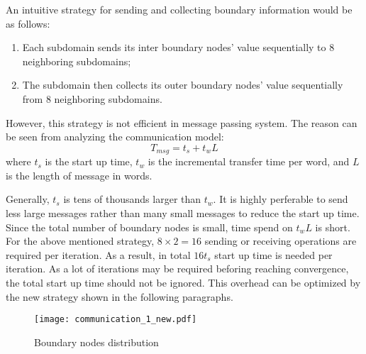 \documentclass{sig-alternate}
\begin{document}
	An intuitive strategy for sending and collecting boundary information would be as follows:

	\begin{enumerate}[1.]
	  \item Each subdomain sends its inter boundary nodes' value sequentially to 8 neighboring subdomains;
	  \item The subdomain then collects its outer boundary nodes' value sequentially from 8 neighboring subdomains.
	\end{enumerate}	

 	However, this strategy is not efficient in message passing system. The reason can be seen from analyzing the
	communication model:
	\begin{equation}
		T_{msg} = t_s + t_wL\label{eq_msg}
	\end{equation}
	where $t_s$ is the start up time, $t_w$ is the incremental transfer time per word, and $L$ is the length of message in words.
	
	Generally, $t_s$ is tens of thousands larger than $t_w$. It is highly perferable to send less 
	large messages rather than many small messages to reduce the start up time. Since the total number of boundary nodes is small, 
	time spend on $t_wL$ is short. For the above mentioned strategy, $8\times 2 = 
	16$ sending or receiving operations are required per iteration. As a result, in total $16t_s$ start up time is
	needed per iteration. As a lot of iterations may be required beforing reaching convergence, the total 
	start up time should not be ignored. This overhead can be optimized by the new strategy shown in the following paragraphs.
\begin{comment}
	In each iteration, only $2$ transferring operations are needed for communication. The new strategy minimizes start up time and 
	greatly decreases the simulation time. However, there is some difficulty to implement above strategy. This is not only because
	the grid connection is irregular, but also because the existance of overlapping. Overlapping makes things even more complicated, 
	as the number of neighboring subdomains are increased from $4$ to $8$, with different overlapping patterns. To overcome this 
	problem, this paper proposes a irregular grid and overlapping friendly communication strategy that achieves optimal 
	minimum communication overhead, which is illustrated as follows.
\end{comment}
	\begin{figure}[htbp]
	  \centering
	  \texttt{[image: communication\_1\_new.pdf]}
	  \caption{Boundary nodes distribution}
	  \label{comm}
	\end{figure}
\end{document}
